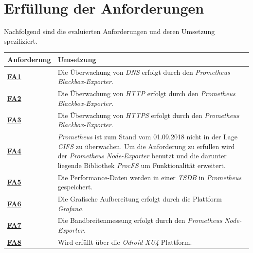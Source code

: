 \documentclass[titlepage]{report}
\begin{document}
\section*{Erfüllung der Anforderungen}
Nachfolgend sind die evaluierten Anforderungen und deren Umsetzung
spezifiziert.
\tabulinesep=1.2mm
\begin{center}
    \begin{tabu}{X[-1] X}
\toprule
\textbf{Anforderung} & \textbf{Umsetzung}  \\
\midrule
        \hyperref[table:FA1]{\textbf{FA1}} & Die Überwachung von \emph{DNS} erfolgt durch den \emph{Prometheus} \emph{Blackbox-Exporter}. \\
        \hyperref[table:FA2]{\textbf{FA2}} & Die Überwachung von \emph{HTTP} erfolgt durch den \emph{Prometheus} \emph{Blackbox-Exporter}. \\
        \hyperref[table:FA3]{\textbf{FA3}} & Die Überwachung von \emph{HTTPS} erfolgt durch den \emph{Prometheus} \emph{Blackbox-Exporter}. \\
        \hyperref[table:FA4]{\textbf{FA4}} & \emph{Prometheus} ist zum Stand vom 01.09.2018 nicht in der Lage \emph{CIFS} zu überwachen. Um die Anforderung zu erfüllen wird der \emph{Prometheus} \emph{Node-Exporter} benutzt und die darunter liegende Bibliothek \emph{ProcFS} um Funktionalität erweitert. \\
        \hyperref[table:FA5]{\textbf{FA5}} & Die Performance-Daten werden in einer \emph{TSDB} in \emph{Prometheus} gespeichert. \\
        \hyperref[table:FA6]{\textbf{FA6}} & Die Grafische Aufbereitung erfolgt durch die Plattform \emph{Grafana}. \\
        \hyperref[table:FA7]{\textbf{FA7}} & Die Bandbreitenmessung erfolgt durch den \emph{Prometheus} \emph{Node-Exporter}. \\
        \hyperref[table:FA8]{\textbf{FA8}} & Wird erfüllt über die \emph{Odroid XU4} Plattform. \\
\bottomrule
    \end{tabu}
    \label{table:mapping1}
\end{center}
\tabulinesep=1.2mm
\end{document}
